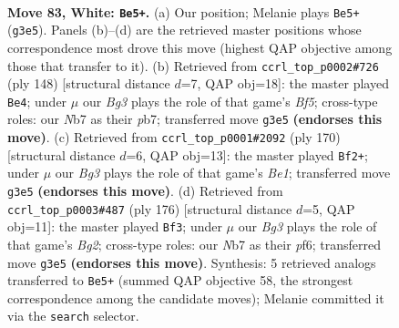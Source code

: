 \documentclass[11pt]{article}
\begin{document}
\clearpage

\begin{figure}[p]\centering
\begin{subfigure}{0.46\textwidth}\centering
\resizebox{\linewidth}{!}{%
\newchessgame
\chessboard[
  setfen={7k/1NP5/8/3K4/8/6B1/2r5/8 w - - 79 83},
  showmover=false,
  pgfstyle=straightmove, color=movearrow, markmove={g3-e5}
]}
\caption{}
\end{subfigure}\hfill
\begin{subfigure}{0.46\textwidth}\centering
\resizebox{\linewidth}{!}{%
\newchessgame
\chessboard[
  setfen={3k4/1p5P/8/5B2/5K2/8/8/7r w - - 1 75},
  showmover=false,
  pgfstyle=straightmove, color=movearrow, markmove={f5-e4}
]}
\caption{}
\end{subfigure}
\\[4pt]
\begin{subfigure}{0.46\textwidth}\centering
\resizebox{\linewidth}{!}{%
\newchessgame
\chessboard[
  setfen={8/k7/8/3P4/8/3r2P1/8/4B1K1 w - - 0 86},
  showmover=false,
  pgfstyle=straightmove, color=movearrow, markmove={e1-f2}
]}
\caption{}
\end{subfigure}\hfill
\begin{subfigure}{0.46\textwidth}\centering
\resizebox{\linewidth}{!}{%
\newchessgame
\chessboard[
  setfen={8/1P6/3k1p2/1r6/5K2/8/6B1/8 w - - 4 89},
  showmover=false,
  pgfstyle=straightmove, color=movearrow, markmove={g2-f3}
]}
\caption{}
\end{subfigure}
\caption{\textbf{Move 83, White: \texttt{Be5+}.} (a) Our position; Melanie plays \texttt{Be5+} (\texttt{g3e5}). Panels (b)--(d) are the retrieved master positions whose correspondence most drove this move (highest QAP objective among those that transfer to it). (b) Retrieved from \texttt{ccrl\_top\_p0002\#726} (ply 148) [structural distance $d$=7, QAP obj=18]: the master played \texttt{Be4}; under $\mu$ our \emph{Bg3} plays the role of that game's \emph{Bf5}; cross-type roles: our \emph{N}b7 as their \emph{p}b7; transferred move \texttt{g3e5} \textbf{(endorses this move)}. (c) Retrieved from \texttt{ccrl\_top\_p0001\#2092} (ply 170) [structural distance $d$=6, QAP obj=13]: the master played \texttt{Bf2+}; under $\mu$ our \emph{Bg3} plays the role of that game's \emph{Be1}; transferred move \texttt{g3e5} \textbf{(endorses this move)}. (d) Retrieved from \texttt{ccrl\_top\_p0003\#487} (ply 176) [structural distance $d$=5, QAP obj=11]: the master played \texttt{Bf3}; under $\mu$ our \emph{Bg3} plays the role of that game's \emph{Bg2}; cross-type roles: our \emph{N}b7 as their \emph{p}f6; transferred move \texttt{g3e5} \textbf{(endorses this move)}. Synthesis: 5 retrieved analogs transferred to \texttt{Be5+} (summed QAP objective 58, the strongest correspondence among the candidate moves); Melanie committed it via the \texttt{search} selector.}
\label{fig:thought-m164}
\end{figure}
\end{document}

